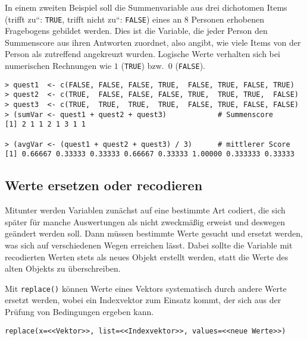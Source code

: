In einem zweiten Beispiel soll die Summenvariable aus drei dichotomen Items ({\quotedblbase}trifft zu{\textquotedblleft}: \lstinline!TRUE!, {\quotedblbase}trifft nicht zu{\textquotedblleft}: \lstinline!FALSE!) eines an $8$ Personen erhobenen Fragebogens gebildet werden. Dies ist die Variable, die jeder Person den Summenscore aus ihren Antworten zuordnet, also angibt, wie viele Items von der Person als zutreffend angekreuzt wurden. Logische Werte verhalten sich bei numerischen Rechnungen wie $1$ (\lstinline!TRUE!) bzw.\ $0$ (\lstinline!FALSE!).
\begin{lstlisting}
> quest1  <- c(FALSE, FALSE, FALSE, TRUE,  FALSE, TRUE, FALSE, TRUE)
> quest2  <- c(TRUE,  FALSE, FALSE, FALSE, TRUE,  TRUE, TRUE,  FALSE)
> quest3  <- c(TRUE,  TRUE,  TRUE,  TRUE,  FALSE, TRUE, FALSE, FALSE)
> (sumVar <- quest1 + quest2 + quest3)            # Summenscore
[1] 2 1 1 2 1 3 1 1

> (avgVar <- (quest1 + quest2 + quest3) / 3)      # mittlerer Score
[1] 0.66667 0.33333 0.33333 0.66667 0.33333 1.00000 0.333333 0.33333
\end{lstlisting}

\subsection{Werte ersetzen oder recodieren}
\label{sec:recode}

Mitunter werden Variablen zunächst auf eine bestimmte Art codiert, die sich später für manche Auswertungen als nicht zweckmäßig erweist und deswegen geändert werden soll. Dann müssen bestimmte Werte gesucht und ersetzt werden, was sich auf verschiedenen Wegen erreichen lässt. Dabei sollte die Variable mit recodierten Werten stets als neues Objekt erstellt werden, statt die Werte des alten Objekts zu überschreiben.

Mit \lstinline!replace()! können Werte eines Vektors systematisch durch andere Werte ersetzt werden, wobei ein Indexvektor zum Einsatz kommt, der sich aus der Prüfung von Bedingungen ergeben kann.
\begin{lstlisting}
replace(x=<<Vektor>>, list=<<Indexvektor>>, values=<<neue Werte>>)
\end{lstlisting}

